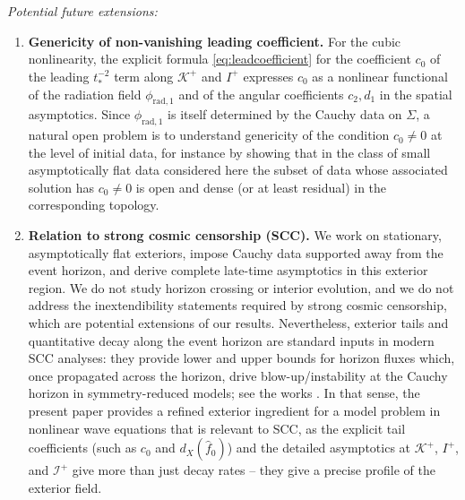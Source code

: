 \documentclass[10pt,a4paper,reqno]{amsart}
\theoremstyle{definition}
\theoremstyle{remark}
\numberwithin{equation}{section}
\begin{document}
\medskip

\textit{Potential future extensions:}
\begin{enumerate}
  \item \textbf{Genericity of non-vanishing leading coefficient.} For the cubic nonlinearity, the explicit formula \eqref{eq:leadcoefficient} for the coefficient $c_0$ of the leading $t_*^{-2}$ term along $\mathcal{K}^+$ and $I^+$ expresses $c_0$ as a nonlinear functional of the radiation field $\phi_{\mathrm{rad},1}$ and of the angular coefficients $c_2,d_1$ in the spatial asymptotics. Since $\phi_{\mathrm{rad},1}$ is itself determined by the Cauchy data on $\Sigma$, a natural open problem is to understand genericity of the condition $c_0\neq 0$ at the level of initial data, for instance by showing that in the class of small asymptotically flat data considered here the subset of data whose associated solution has $c_0\neq 0$ is open and dense (or at least residual) in the corresponding topology.


  \item \textbf{Relation to strong cosmic censorship (SCC).} We work on stationary, asymptotically flat exteriors, impose Cauchy data supported away from the event horizon, and derive complete late-time asymptotics in this exterior region. We do not study horizon crossing or interior evolution, and we do not address the inextendibility statements required by strong cosmic censorship, which are potential extensions of our results. Nevertheless, exterior tails and quantitative decay along the event horizon are standard inputs in modern SCC analyses: they provide lower and upper bounds for horizon fluxes which, once propagated across the horizon, drive blow-up/instability at the Cauchy horizon in symmetry-reduced models; see the works \cite{Luk2019a,Luk2019b,LukOh,DafermosLuk2017}. In that sense, the present paper provides a refined exterior ingredient for a model problem in nonlinear wave equations that is relevant to SCC, as the explicit tail coefficients (such as $c_0$ and $d_X(\widehat f_0)$) and the detailed asymptotics at $\mathcal K^+$, $I^+$, and $\mathscr I^+$ give more than just decay rates -- they give a precise profile of the exterior field. 


\end{enumerate}
\end{document}

